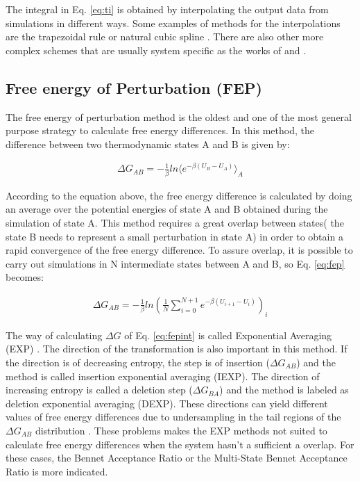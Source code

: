 The integral in Eq. \eqref{eq:ti} is obtained by interpolating the output data from simulations in different ways. Some examples of methods for the interpolations are the trapezoidal rule or natural cubic spline \cite{bareva}. There are also other more complex schemes that are usually system specific as the works of  and . 

\subsection{Free energy of Perturbation (FEP)}

The free energy of perturbation method \cite{zwanzig1954} is the oldest and one of the most general purpose strategy to calculate free energy differences. In this method, the difference between two thermodynamic states A and B is given by:

\begin{equation}
\label{eq:fep}
\begin{aligned}
\Delta G_{AB} = -\frac{1}{\beta} ln \langle{e^{-\beta (U_{B}-U_{A})}}\rangle_{A}
\end{aligned}
\end{equation}

According to the equation above, the free energy difference is calculated by doing an average over the potential energies of state A and B obtained during the simulation of state A. This method requires a great overlap between states( the state B needs to represent a small perturbation in state A) in order to obtain a rapid convergence of the free energy difference. To assure overlap, it is possible to carry out simulations in N intermediate states between A and B, so Eq. \eqref{eq:fep} becomes:

\begin{equation}
\label{eq:fepint}
\begin{aligned}
\Delta G_{AB} = -\frac{1}{\beta} ln \left(\frac{1}{N}\sum_{i=0}^{N+1}
{e^{-\beta (U_{i+1}-U_{i})}}\right)_{i}
\end{aligned}
\end{equation}

The way of calculating $\Delta G$ of Eq. \eqref{eq:fepint} is called Exponential Averaging (EXP) \cite{zwanzig1955,bareva}. The direction of the transformation is also important in this method. If the direction is of decreasing entropy, the step is of insertion ($\Delta G_{AB}$) and the method is called insertion exponential averaging (IEXP). The direction of increasing entropy is  called a deletion step ($\Delta G_{BA}$) and the method is labeled as deletion exponential averaging (DEXP). These directions can yield different values of free energy differences due to undersampling in the tail regions of the $\Delta G_{AB}$ distribution \cite{klimovich,pohorille2010}. These problems makes the EXP methods not suited to calculate free energy differences when the system hasn't a sufficient a overlap. For these cases, the Bennet Acceptance Ratio or the Multi-State Bennet Acceptance Ratio is more indicated.   

